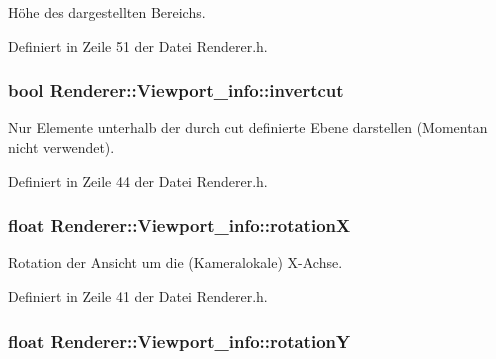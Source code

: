 Höhe des dargestellten Bereichs. 



Definiert in Zeile 51 der Datei Renderer.\-h.

\hypertarget{structRenderer_1_1Viewport__info_a0e06e17e13e9639179de762f6a45c71e}{
\subsubsection[{invertcut}]{\setlength{\rightskip}{0pt plus 5cm}bool Renderer\-::\-Viewport\-\_\-info\-::invertcut}}\label{structRenderer_1_1Viewport__info_a0e06e17e13e9639179de762f6a45c71e}


Nur Elemente unterhalb der durch cut definierte Ebene darstellen (Momentan nicht verwendet). 



Definiert in Zeile 44 der Datei Renderer.\-h.

\hypertarget{structRenderer_1_1Viewport__info_ad8005e4eaa631f4c6b96cf6be05e8428}{
\subsubsection[{rotation\-X}]{\setlength{\rightskip}{0pt plus 5cm}float Renderer\-::\-Viewport\-\_\-info\-::rotation\-X}}\label{structRenderer_1_1Viewport__info_ad8005e4eaa631f4c6b96cf6be05e8428}


Rotation der Ansicht um die (Kameralokale) X-\/\-Achse. 



Definiert in Zeile 41 der Datei Renderer.\-h.

\hypertarget{structRenderer_1_1Viewport__info_a80fe2d86956d26105dd8301278e0c4e6}{
\subsubsection[{rotation\-Y}]{\setlength{\rightskip}{0pt plus 5cm}float Renderer\-::\-Viewport\-\_\-info\-::rotation\-Y}}\label{structRenderer_1_1Viewport__info_a80fe2d86956d26105dd8301278e0c4e6}


